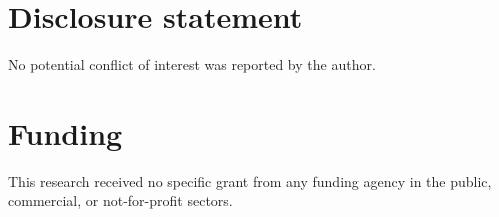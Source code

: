 \documentclass[sn-mathphys-num, Numbered]{sn-jnl}%
\theoremstyle{thmstyleone}%
\theoremstyle{thmstyletwo}%
\theoremstyle{thmstylethree}%
\providecommand{\DIFaddend}{} %
\DeclareRobustCommand{\DIFaddend}{\DIFOaddend \let\includegraphics\DIFOincludegraphics} %
\begin{document}
\DIFaddend %

\section*{Disclosure statement}
No potential conflict of interest was reported by the author.


\section*{Funding}
This research received no specific grant from any funding agency in the public, commercial, or not-for-profit sectors.



\end{document}
